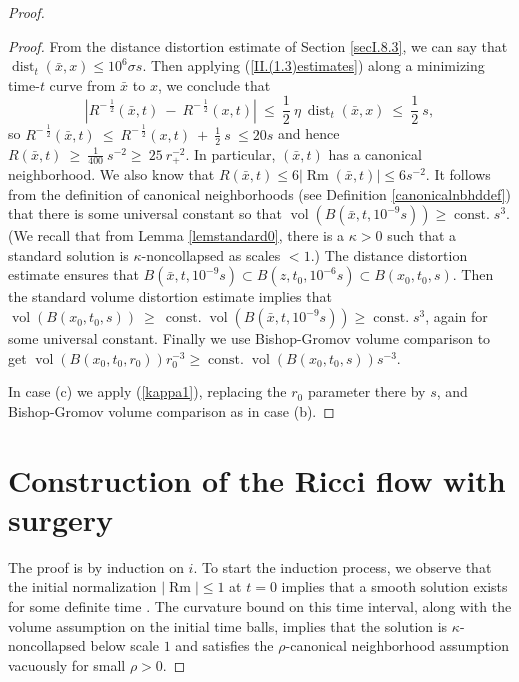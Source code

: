 \documentclass[12pt]{amsart}
\newcommand{\const}{\operatorname{const.}}
\newcommand{\dist}{\operatorname{dist}}
\newcommand{\Rm}{\operatorname{Rm}}
\newcommand{\vol}{\operatorname{vol}}
\numberwithin{equation}{section}
\theoremstyle{plain}
\theoremstyle{definition}
\theoremstyle{remark}
\begin{document}
\begin{proof}
\begin{proof}
From the distance distortion estimate of Section \ref{secI.8.3},
we can say that $\dist_{t} (\bar x, x) \le 10^6 \sigma s$.
Then applying (\ref{II.(1.3)estimates}) along a minimizing
time-$t$ curve from $\bar x$ to $x$, we conclude that
\begin{equation}
|R^{- \: \frac12}(\bar x, t) \: - \: R^{- \: \frac12}(x, t)| \: \le \:
\frac12 \: \eta \: \dist_{t} (\bar x, x) \: \le \: \frac12 \: s,
\end{equation}
so $R^{- \: \frac12}(\bar x, t) \: \le \:  
R^{- \: \frac12}(x, t) \: + \: \frac12 \: s \: \le 20s$ and hence
$R(\bar x, t) \: \ge \: \frac{1}{400} \: s^{-2} \ge \: 25 \: r_+^{-2}$.
In particular, $(\bar x,t)$ has a canonical neighborhood.
We also know that $R(\bar x, t) \le 6 |\Rm (\bar x, t)| \le 6 s^{-2}$.
It follows from the definition of canonical neighborhoods
(see Definition \ref{canonicalnbhddef}) that
there is some universal constant so that
$\vol(B(\bar x,t,10^{-9}s) ) \ge \const s^3$.
(We recall that from Lemma \ref{lemstandard0},
there is a $\kappa>0$ such that a standard solution
is $\kappa$-noncollapsed as scales $<1$.)
The distance distortion
estimate ensures that $B(\bar x,t,10^{-9}s) \subset
B(z,t_0,10^{-6}s) \subset B(x_0,t_0,s)$. Then the standard volume
distortion estimate implies that 
$\vol(B(x_0,t_0,s)) \: \ge \: \const 
\vol(B(\bar x,t,10^{-9}s) ) \ge \const s^3$,
again for some universal constant.
Finally we use Bishop-Gromov volume comparison to get 
$\vol(B(x_0,t_0,r_0))r_0^{-3}\geq \const \vol(B(x_0,t_0,s))s^{-3}$.
 
In case (c) we apply (\ref{kappa1}), replacing the
$r_0$ parameter there by $s$, and Bishop-Gromov
volume comparison as in case (b). 
\end{proof}


\section{Construction of the Ricci flow with surgery}  \label{surgeryflow}

The proof is by induction on $i$.
To start the induction process, 
we observe that 
the initial normalization
$|\Rm|\leq 1$ at $t=0$
implies that a smooth solution exists for some definite time
\cite[Corollary 7.7]{Chow-Knopf}.
The curvature bound on this time interval, along with the
volume assumption on the initial time balls,
implies that the solution is $\kappa$-noncollapsed below  scale $1$
and satisfies the  $\rho$-canonical neighborhood assumption 
vacuously for small $\rho>0$.


\end{proof}
\end{document}

